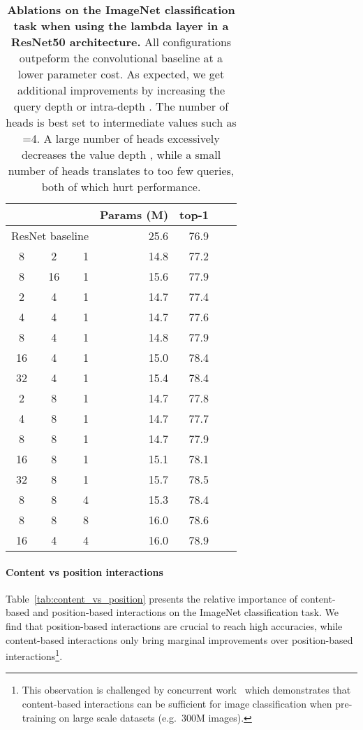 \documentclass{article} \usepackage{iclr2021_conference,times}
\begin{document}
\begin{table}[h]
  \begin{center}
  \small
  \begin{tabular}{ccrrrrr}
    \toprule
     &  &  & Params (M) & top-1 \\
    \midrule
    \multicolumn{3}{c}{ResNet baseline} & 25.6 & 76.9 \\
    \midrule
    8 & 2 & 1 & 14.8 & 77.2 \\
    8 & 16 & 1 & 15.6 & 77.9 \\
    \midrule
    2 & 4 & 1 & 14.7 & 77.4 \\
    4 & 4 & 1 & 14.7 & 77.6 \\
    8 & 4 & 1 & 14.8 & 77.9 \\
    16 & 4 & 1 & 15.0 & 78.4 \\
    32 & 4 & 1 & 15.4 & 78.4 \\
    \midrule
    2 & 8 & 1 & 14.7 & 77.8 \\
    4 & 8 & 1 & 14.7 & 77.7 \\
    8 & 8 & 1 & 14.7 & 77.9 \\
    16 & 8 & 1 & 15.1 & 78.1 \\
    32 & 8 & 1 & 15.7 & 78.5 \\
    \midrule
    8 & 8 & 4 & 15.3 & 78.4 \\
    8 & 8 & 8 & 16.0 & 78.6 \\
    16 & 4 & 4 & 16.0 & 78.9 \\
    \bottomrule
  \end{tabular}
  \caption{
  \textbf{Ablations on the ImageNet classification task when using the lambda layer in a ResNet50 architecture.}
  All configurations outpeform the convolutional baseline at a lower parameter cost.
  As expected, we get additional improvements by increasing the query depth  or intra-depth . 
  The number of heads is best set to intermediate values such as =4.
  A large number of heads  excessively decreases the value depth , while a small number of heads translates to too few queries, both of which hurt performance.
  }
  \label{tab:ablations}
  \end{center}
\end{table}

\vspace{-0.1cm}
\paragraph{Content vs position interactions\label{sec:content_vs_position}}
Table~\ref{tab:content_vs_position} presents the relative importance of content-based and position-based interactions on the ImageNet classification task.
We find that position-based interactions are crucial to reach high accuracies, while content-based interactions only bring marginal improvements over position-based interactions\footnote{This observation is challenged by concurrent work~\citep{dosovitskiy2020image} which demonstrates that content-based interactions can be sufficient for image classification when pre-training on large scale datasets (e.g.\ 300M images).}.
\end{document}
